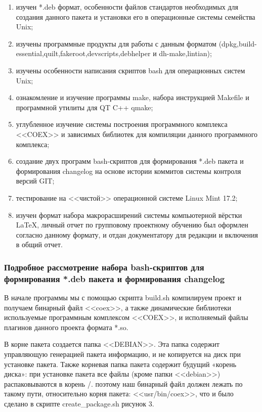 \begin{enumerate}
\item изучен *.deb формат, особенности файлов стандартов необходимых для создания данного пакета и установки его в операционные системы семейства Unix; 
\item изучены программные продукты для работы с данным форматом (dpkg,build-essential,quilt,fakeroot,devscripts,debhelper и dh-make,lintian);
\item изучены особенности написания скриптов bash для операционных систем Unix;
\item ознакомление и изучение программы make, набора инструкцией Makefile и программной утилиты для QT C++ qmake;
\item углубленное изучение системы построения программного комплекса <<COEX>> и зависимых библиотек для компиляции данного программного комплекса;
\item создание двух программ bash-скриптов для формирования *.deb пакета и формирования changelog на основе истории коммитов системы контроля версий GIT;
\item тестирование на <<чистой>> операционной системе Linux Mint 17.2;
\item изучен формат набора макрорасширений системы компьютерной вёрстки LaTeX, личный отчет по групповому проектному обучению был оформлен согласно данному формату, и отдан документатору для редакции и включения в общий отчет.
\end{enumerate}

\subsubsection{ Подробное рассмотрение набора bash-скриптов для формирования *.deb пакета и формирования changelog}

В начале программы мы с помощью скрипта build.sh компилируем проект и получаем бинарный файл <<coex>>, а также динамические библиотеки используемые программным комплексом <<COEX>>, и исполняемый файлы плагинов данного проекта формата *.so. 

В корне пакета создается папка <<DEBIAN>>. Эта папка содержит управляющую генерацией пакета информацию, и не копируется на диск при установке пакета.
Также корневая папка пакета содержит будущий «корень диска»: при установке пакета все файлы (кроме папки <<debian>>) распаковываются в корень /. поэтому наш бинарный файл должен лежать по такому пути, относительно корня пакета: <<usr/bin/coex>>, что и было сделано в скрипте create\_package.sh рисунок 3. 

